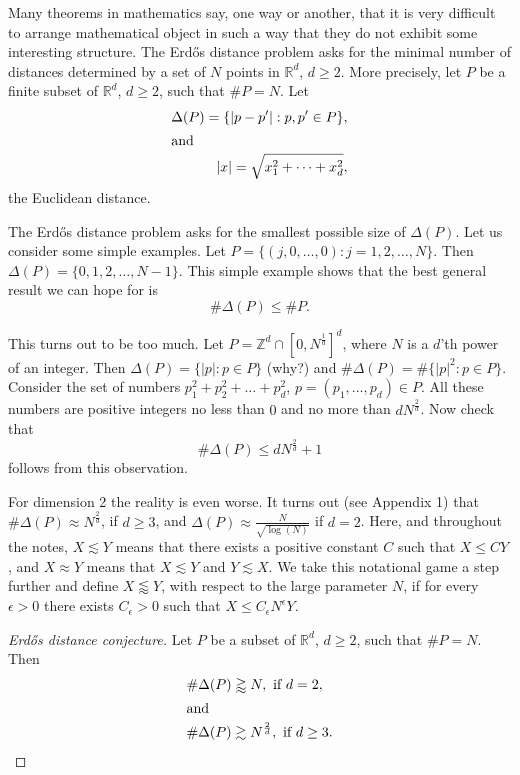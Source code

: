 \documentclass[]{amsart}
\numberwithin{equation}{section}
\theoremstyle{plain}
\theoremstyle{definition}
\theoremstyle{remark}
\begin{document}
Many theorems in mathematics say, one way or another, that it is
very difficult to arrange mathematical object in such a way that
they do not exhibit some interesting structure. The Erd\H{o}s distance
problem asks for the minimal number of distances determined by a
set  of $N$ points in $\mathbb{R}^d$, $d \ge 2$. More precisely, let
$P$ be a finite subset of $ \mathbb{R}^d$, $d \ge 2$, such that $\#
P=N$. Let
\begin{align}
 \Delta(P)=\{|p-p'|: p,p' \in P\},
\\
\intertext{and}
 |x|=\sqrt{x_1^2+\dots+x_d^2},
\end{align}
 the Euclidean distance.

The Erd\H{o}s distance problem asks for the smallest possible size
of $\Delta(P)$. Let us consider some simple examples. Let
$P=\{(j,0, \dots, 0): j=1,2, \dots, N\}$. Then $\Delta(P)=\{0,1,2,
\dots, N-1\}$. This simple example shows that the best general
result we can hope for is
\begin{equation}
\# \Delta(P) \leq \# P. \end{equation}



This turns out to be too much. Let $P=\mathbb{Z}^d \cap {[0,
N^{\frac{1}{d}}]}^d$, where $N$ is a $d$'th power of an integer.
Then $\Delta(P)=\{|p|: p \in P\}$ (why?) and $\# \Delta(P)=\#
\{{|p|}^2: p \in P\}$. Consider the set of numbers
$p_1^2+p_2^2+\dots+p_d^2$, $p=(p_1, \dots, p_d) \in P$. All these
numbers are positive integers no less than $0$ and no more than
$dN^{\frac{2}{d}}$. Now check that
\begin{equation}
\# \Delta(P) \leq dN^{\frac{2}{d}}+1
\end{equation} follows from this observation.



For dimension 2 the reality is even worse. It turns out (see
Appendix 1) that $\# \Delta(P) \approx N^{\frac{2}{d}}$, if $d
\geq 3$, and $\Delta(P) \approx \frac{N}{\sqrt{\log(N)}}$ if
$d=2$. Here, and throughout the notes, $X \lesssim Y$ means that
there exists a positive constant $C$ such that $X \leq CY$, and $X
\approx Y$ means that $X \lesssim Y$ and $Y \lesssim X$. We take
this notational game a step further and define $X \lessapprox Y$,
with respect to the large parameter $N$, if for every $\epsilon>0$
there exists $C_{\epsilon}>0$ such that $X \leq
C_{\epsilon}N^{\epsilon}Y$.

\begin{proof}[Erd\H{o}s distance conjecture] Let $P$ be a subset of
$\mathbb{R}^d$, $d \ge 2$, such that $\# P=N$. Then
\begin{align}
\# \Delta(P) &\gtrapprox N, \ \text{if} \ d=2, \\ \intertext{and}
\# \Delta(P) &\gtrsim N^{\frac{2}{d}}, \ \text{if} \ d \ge 3.
\end{align}
\end{proof}
\end{document}
